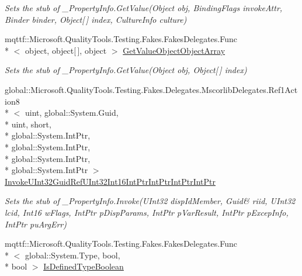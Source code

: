 \begin{DoxyCompactItemize}
\begin{DoxyCompactList}\small\item\em Sets the stub of \-\_\-\-Property\-Info.\-Get\-Value(\-Object obj, Binding\-Flags invoke\-Attr, Binder binder, Object\mbox{[}$\,$\mbox{]} index, Culture\-Info culture)\end{DoxyCompactList}\item 
mqttf\-::\-Microsoft.\-Quality\-Tools.\-Testing.\-Fakes.\-Fakes\-Delegates.\-Func\\*
$<$ object, object\mbox{[}$\,$\mbox{]}, object $>$ \hyperlink{class_system_1_1_runtime_1_1_interop_services_1_1_fakes_1_1_stub___property_info_ad08a304baaee94609538ef97f9836413}{Get\-Value\-Object\-Object\-Array}
\begin{DoxyCompactList}\small\item\em Sets the stub of \-\_\-\-Property\-Info.\-Get\-Value(\-Object obj, Object\mbox{[}$\,$\mbox{]} index)\end{DoxyCompactList}\item 
global\-::\-Microsoft.\-Quality\-Tools.\-Testing.\-Fakes.\-Delegates.\-Mscorlib\-Delegates.\-Ref1\-Action8\\*
$<$ uint, global\-::\-System.\-Guid, \\*
uint, short, \\*
global\-::\-System.\-Int\-Ptr, \\*
global\-::\-System.\-Int\-Ptr, \\*
global\-::\-System.\-Int\-Ptr, \\*
global\-::\-System.\-Int\-Ptr $>$ \hyperlink{class_system_1_1_runtime_1_1_interop_services_1_1_fakes_1_1_stub___property_info_a99b43a0a140e6432fcea8f95d7f66056}{Invoke\-U\-Int32\-Guid\-Ref\-U\-Int32\-Int16\-Int\-Ptr\-Int\-Ptr\-Int\-Ptr\-Int\-Ptr}
\begin{DoxyCompactList}\small\item\em Sets the stub of \-\_\-\-Property\-Info.\-Invoke(U\-Int32 disp\-Id\-Member, Guid\& riid, U\-Int32 lcid, Int16 w\-Flags, Int\-Ptr p\-Disp\-Params, Int\-Ptr p\-Var\-Result, Int\-Ptr p\-Excep\-Info, Int\-Ptr pu\-Arg\-Err)\end{DoxyCompactList}\item 
mqttf\-::\-Microsoft.\-Quality\-Tools.\-Testing.\-Fakes.\-Fakes\-Delegates.\-Func\\*
$<$ global\-::\-System.\-Type, bool, \\*
bool $>$ \hyperlink{class_system_1_1_runtime_1_1_interop_services_1_1_fakes_1_1_stub___property_info_a5be8beda0c48944bec1a86902d10a390}{Is\-Defined\-Type\-Boolean}

\end{DoxyCompactItemize}
